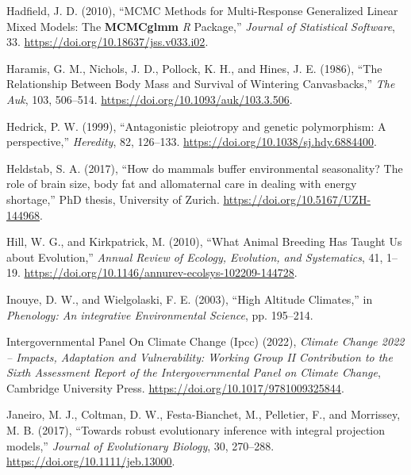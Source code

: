 \documentclass[
  12pt,
  letterpaper,
]{scrartcl}
\newlength{\cslhangindent}
\newenvironment{CSLReferences}[2] %
 {\begin{list}{}{%
  \setlength{\itemindent}{0pt}
  \setlength{\leftmargin}{0pt}
  \setlength{\parsep}{0pt}
  \ifodd #1
   \setlength{\leftmargin}{\cslhangindent}
   \setlength{\itemindent}{-1\cslhangindent}
  \fi
  \setlength{\itemsep}{#2\baselineskip}}}
 {\end{list}}
\begin{document}
\begin{CSLReferences}{1}{0}
Hadfield, J. D. (2010), {``{MCMC Methods} for {Multi-Response
Generalized Linear Mixed Models}: {The} {\textbf{MCMCglmm}} {\emph{R}}
{Package},''} \emph{Journal of Statistical Software}, 33.
\url{https://doi.org/10.18637/jss.v033.i02}.

Haramis, G. M., Nichols, J. D., Pollock, K. H., and Hines, J. E. (1986),
{``The {Relationship Between Body Mass} and {Survival} of {Wintering
Canvasbacks},''} \emph{The Auk}, 103, 506--514.
\url{https://doi.org/10.1093/auk/103.3.506}.

Hedrick, P. W. (1999), {``Antagonistic pleiotropy and genetic
polymorphism: A perspective,''} \emph{Heredity}, 82, 126--133.
\url{https://doi.org/10.1038/sj.hdy.6884400}.

Heldstab, S. A. (2017), {``How do mammals buffer environmental
seasonality? {The} role of brain size, body fat and allomaternal care in
dealing with energy shortage,''} PhD thesis, University of Zurich.
\url{https://doi.org/10.5167/UZH-144968}.

Hill, W. G., and Kirkpatrick, M. (2010), {``What {Animal Breeding Has
Taught Us} about {Evolution},''} \emph{Annual Review of Ecology,
Evolution, and Systematics}, 41, 1--19.
\url{https://doi.org/10.1146/annurev-ecolsys-102209-144728}.

Inouye, D. W., and Wielgolaski, F. E. (2003), {``High {Altitude
Climates},''} in \emph{Phenology: {An} integrative {Environmental
Science}}, pp. 195--214.

Intergovernmental Panel On Climate Change (Ipcc) (2022), \emph{Climate
{Change} 2022 -- {Impacts}, {Adaptation} and {Vulnerability}: {Working
Group II Contribution} to the {Sixth Assessment Report} of the
{Intergovernmental Panel} on {Climate Change}}, Cambridge University
Press. \url{https://doi.org/10.1017/9781009325844}.

Janeiro, M. J., Coltman, D. W., Festa-Bianchet, M., Pelletier, F., and
Morrissey, M. B. (2017), {``Towards robust evolutionary inference with
integral projection models,''} \emph{Journal of Evolutionary Biology},
30, 270--288. \url{https://doi.org/10.1111/jeb.13000}.


\end{CSLReferences}
\end{document}
